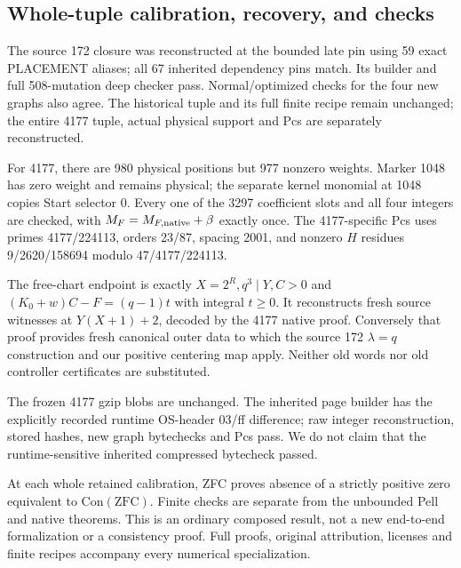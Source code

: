 \subsection{Whole-tuple calibration, recovery, and checks}
The source 172 closure was reconstructed at the bounded late pin using 59
exact PLACEMENT aliases; all 67 inherited dependency pins match. Its
builder and full 508-mutation deep checker pass. Normal/optimized checks
for the four new graphs also agree. The historical tuple and its full
finite recipe remain unchanged; the entire 4177 tuple, actual physical
support and Pcs are separately reconstructed.

For 4177, there are 980 physical positions but 977 nonzero weights. Marker 1048
has zero weight and remains physical; the separate kernel monomial at 1048
copies Start selector 0. Every one of the 3297 coefficient slots and all
four integers are checked, with $M_F=M_{F,\rm native}+\beta$ exactly once.
The 4177-specific Pcs uses primes 4177/224113, orders 23/87, spacing 2001,
and nonzero $H$ residues 9/2620/158694 modulo 47/4177/224113.

The free-chart endpoint is exactly $X=2^R,q^3\mid Y,C>0$ and
$(K_0+w)C-F=(q-1)t$ with integral $t\ge0$. It reconstructs fresh source
witnesses at $Y(X+1)+2$, decoded by the 4177 native proof. Conversely that
proof provides fresh canonical outer data to which the source 172
$\lambda=q$ construction and our positive centering map apply.
Neither old words nor old controller certificates are substituted.

The frozen 4177 gzip blobs are unchanged. The inherited page builder
has the explicitly recorded runtime OS-header 03/ff difference; raw integer
reconstruction, stored hashes, new graph bytechecks and Pcs pass. We do
not claim that the runtime-sensitive inherited compressed bytecheck passed.

At each whole retained calibration, ZFC proves absence of a strictly
positive zero equivalent to $\mathrm{Con}(\mathrm{ZFC})$. Finite checks
are separate from the unbounded Pell and native theorems. This is an
ordinary composed result, not a new end-to-end formalization or a
consistency proof. Full proofs, original attribution, licenses and finite
recipes accompany every numerical specialization.
